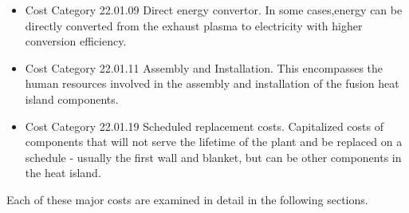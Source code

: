\begin{itemize}
    \item Cost Category 22.01.09 Direct energy convertor. In some cases,energy can be directly converted from the exhaust plasma to electricity with higher conversion efficiency.
    
    \item Cost Category 22.01.11 Assembly and Installation. This encompasses the human resources involved in the assembly and installation of the fusion heat island components.

    \item Cost Category 22.01.19 Scheduled replacement costs.  Capitalized costs of components that will not serve the lifetime of the plant and be replaced on a schedule - usually the first wall and blanket, but can be other components in the heat island.
 \end{itemize}


Each of these major costs are examined in detail in the following sections.